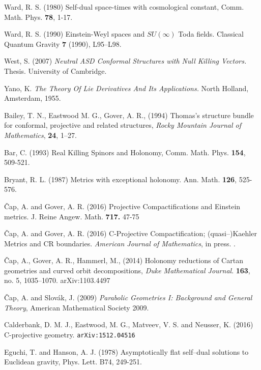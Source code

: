 \begin{thebibliography}{}
   Ward, R. S. (1980)
Self-dual space-times with cosmological constant,
Comm. Math. Phys. {\bf 78},  1-17.

 Ward, R. S. (1990) Einstein-Weyl spaces and 
$SU(\infty)$ Toda fields. Classical Quantum Gravity {\bf 7} (1990), L95–L98.


 West, S. (2007) {\em Neutral ASD Conformal Structures with Null Killing Vectors.} Thesis. University of Cambridge.

 Yano, K. {\em The Theory Of Lie Derivatives And Its Applications.} North Holland, Amsterdam, 1955.




 Bailey, T. N., Eastwood M. G., Gover, A. R., (1994)
Thomas's structure bundle for conformal, projective
  and related structures, {\em Rocky Mountain Journal of
    Mathematics}, {\bf 24}, 1--27.
  
 Bar, C. (1993) 
Real Killing Spinors and Holonomy,
Comm. Math. Phys. {\bf 154}, 509-521.

 Bryant, R. L. (1987)
Metrics with exceptional holonomy. Ann. Math. {\bf 126}, 525-576.


 \v Cap, A. and Gover, A. R. (2016)
Projective Compactifications and Einstein metrics.
J. Reine Angew. Math. {\bf 717.}  47-75

 \v Cap, A. and Gover, A. R. (2016)
C-Projective Compactification; (quasi--)Kaehler Metrics and CR boundaries.
{\em  American Journal of Mathematics}, in press. .

 \v Cap, A., Gover, A. R., Hammerl, M., (2014) 
  Holonomy reductions of Cartan geometries and curved orbit
  decompositions, {\em Duke Mathematical Journal}. 
{\bf 163}, no. 5, 1035--1070.
 \quad arXiv:1103.4497

  
\v{C}ap, A. and Slov\'ak, J. (2009)
\emph{Parabolic Geometries I: Background and General Theory},
American Mathematical Society 2009.


 Calderbank,  D. M. J.,  Eastwood, M. G.,  Matveev, V. S. and 
Neusser, K.  (2016) C-projective geometry. {\tt arXiv:1512.04516}






Eguchi, T. and Hanson, A. J. (1978) Asymptotically flat self--dual solutions
to Euclidean gravity, Phys. Lett. B74, 249-251.


\end{thebibliography}
